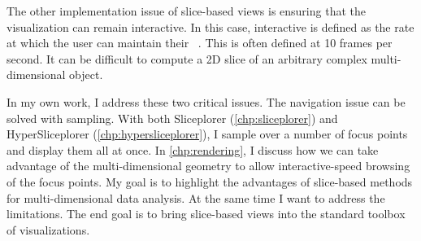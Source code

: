 The other implementation issue of slice-based views is ensuring that the
visualization can remain interactive. In this case, interactive is defined as
the rate at which the user can maintain their ~\cite{Shneiderman:????}. This is often defined at 10 frames per second.
It can be difficult to compute a 2D slice of an arbitrary complex
multi-dimensional object. 

In my own work, I address these two critical issues. The navigation issue can
be solved with sampling. With both Sliceplorer (\autoref{chp:sliceplorer}) and
HyperSliceplorer (\autoref{chp:hypersliceplorer}), I sample over a number of
focus points and display them all at once. In \autoref{chp:rendering}, I
discuss how we can take advantage of the multi-dimensional geometry to allow
interactive-speed browsing of the focus points. My goal is to highlight the
advantages of slice-based methods for multi-dimensional data analysis. At the
same time I want to address the limitations. The end goal is to bring
slice-based views into the standard toolbox of visualizations.




